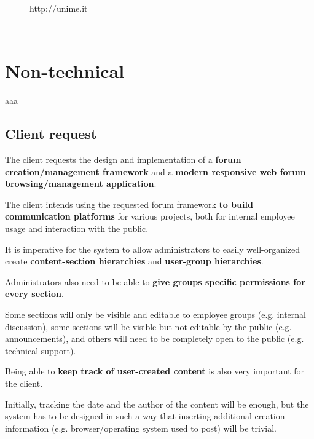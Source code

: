 \documentclass[12pt]{report}
\renewcommand\emph{\textbf}
\begin{document}
\begin{titlepage}
\begin{minipage}{\linewidth}
\begin{minipage}{0.35\linewidth}
\begin{figure}[H]
                    http://unime.it
                \end{figure}
            \end{minipage}
        \end{minipage}\\[3cm]
    \end{titlepage}

    \newcommand{\atoc}[1]{\addtocontents{toc}{#1\par}}
    \renewcommand{\thesection}{\arabic{section}.}
    \tableofcontents
    \newpage

    \part{Non-technical}
        aaa

        \chapter{Client request}
            The client requests the design and implementation of a \emph{forum creation/management framework} and a \emph{modern responsive web forum browsing/management application}.

            The client intends using the requested forum framework \emph{to build communication platforms} for various projects, both for internal employee usage and interaction with the public.

            It is imperative for the system to allow administrators to easily well-organized create \emph{content-section hierarchies} and \emph{user-group hierarchies}.

            Administrators also need to be able to \emph{give groups specific permissions for every section}.

            Some sections will only be visible and editable to employee groups (e.g. internal discussion), some sections will be visible but not editable by the public (e.g. announcements), and others will need to be completely open to the public (e.g. technical support).

            Being able to \emph{keep track of user-created content} is also very important for the client.

            Initially, tracking the date and the author of the content will be enough, but the system has to be designed in such a way that inserting additional creation information (e.g. browser/operating system used to post) will be trivial.
\end{document}

